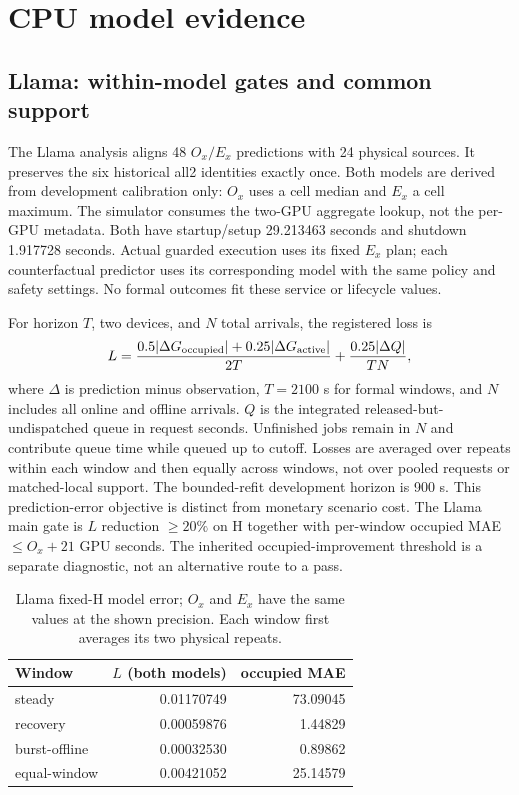 \section{CPU model evidence}
\subsection{Llama: within-model gates and common support}
The Llama analysis aligns 48 $O_x/E_x$ predictions with 24 physical
sources. It preserves the six historical all2 identities exactly once. Both
models are derived from development calibration only: $O_x$ uses a cell median
and $E_x$ a cell maximum. The simulator consumes the two-GPU aggregate lookup,
not the per-GPU metadata. Both have startup/setup 29.213463 seconds and shutdown
1.917728 seconds. Actual guarded execution uses its fixed $E_x$ plan; each
counterfactual predictor uses its corresponding model with the same policy and
safety settings. No formal outcomes fit these service or lifecycle values.

For horizon $T$, two devices, and $N$ total arrivals, the registered loss is
\begin{equation}
 L=\frac{0.5|\Delta G_{\rm occupied}|+0.25|\Delta G_{\rm active}|}{2T}
   +\frac{0.25|\Delta Q|}{TN},
\end{equation}
where $\Delta$ is prediction minus observation, $T=2100$ s for formal windows,
and $N$ includes all online and offline arrivals. $Q$ is the integrated
released-but-undispatched queue in request seconds. Unfinished jobs remain in
$N$ and contribute queue time while queued up to cutoff. Losses are averaged
over repeats within each window and then equally across windows, not over
pooled requests or matched-local support. The bounded-refit development horizon is 900 s.
This prediction-error objective is distinct from monetary scenario cost. The Llama main
gate is $L$ reduction $\geq20\%$ on H together with per-window occupied
MAE $\leq O_x+21$ GPU seconds. The inherited occupied-improvement threshold is
a separate diagnostic, not an alternative route to a pass.

\begin{table}[t]
\centering
\small
\caption{Llama fixed-H model error; $O_x$ and $E_x$ have the same values at the
shown precision. Each window first averages its two physical repeats.}
\label{tab:w2model}
\par\vspace{4pt}
\begin{tabular*}{\linewidth}{@{\extracolsep{\fill}}lrr@{}}
\toprule
Window & $L$ (both models) & occupied MAE\\
\midrule
steady & 0.01170749 & 73.09045\\
recovery & 0.00059876 & 1.44829\\
burst-offline & 0.00032530 & 0.89862\\
equal-window & 0.00421052 & 25.14579\\
\bottomrule
\end{tabular*}
\end{table}

